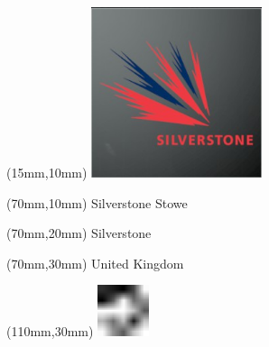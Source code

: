 \null\newpage
\begin{textblock*}{50mm}(15mm,10mm)%
\includegraphics[width=50mm]{LG/2015-05-20_00094.png}
\end{textblock*}
\begin{textblock*}{130mm}(70mm,10mm)%
{\fontsize{20}{20}\selectfont Silverstone Stowe}\\
\end{textblock*}
\begin{textblock*}{120mm}(70mm,20mm)%
{\fontsize{16}{16}\selectfont Silverstone}\\
\end{textblock*}
\begin{textblock*}{120mm}(70mm,30mm)%
{\fontsize{12}{12}\selectfont United Kingdom}
\end{textblock*}
\begin{textblock*}{30mm}(110mm,30mm)%
\centering
\includegraphics[height=15mm]{icons/fa-rotate-left.pdf}
\end{textblock*}
